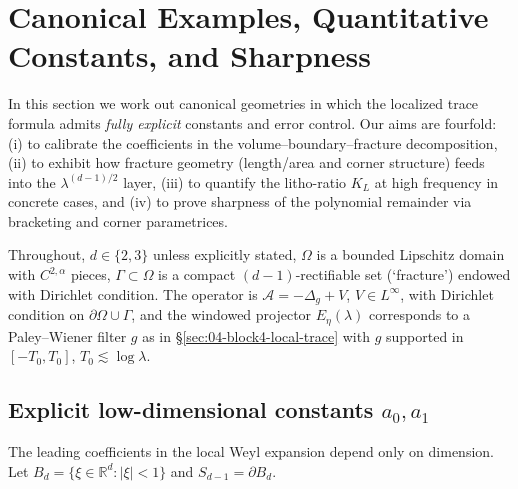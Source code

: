 

\section{Canonical Examples, Quantitative Constants, and Sharpness}
\label{sec:04-block6-canonical-examples}

In this section we work out canonical geometries in which the localized trace formula
admits \emph{fully explicit} constants and error control. Our aims are fourfold:
(i) to calibrate the coefficients in the volume--boundary--fracture decomposition,
(ii) to exhibit how fracture geometry (length/area and corner structure) feeds into the
$\lambda^{(d-1)/2}$ layer,
(iii) to quantify the litho-ratio $K_L$ at high frequency in concrete cases,
and (iv) to prove sharpness of the polynomial remainder via bracketing and corner parametrices.

Throughout, $d\in\{2,3\}$ unless explicitly stated, $\Omega$ is a bounded Lipschitz domain
with $C^{2,\alpha}$ pieces, $\Gamma\subset\Omega$ is a compact $(d-1)$-rectifiable set
(`fracture') endowed with Dirichlet condition. The operator is
$\mathcal{A}=-\Delta_g + V$, $V\in L^\infty$, with Dirichlet condition on $\partial\Omega\cup\Gamma$,
and the windowed projector $E_\eta(\lambda)$ corresponds to a Paley--Wiener
filter $g$ as in \S\ref{sec:04-block4-local-trace} with $\widehat g$ supported in $[-T_0,T_0]$,
$T_0\lesssim \log \lambda$.

\subsection{Explicit low-dimensional constants $a_0, a_1$}
\label{sub:explicit-constants}

The leading coefficients in the local Weyl expansion depend only on dimension.
Let $B_d=\{\xi\in\mathbb{R}^d:|\xi|<1\}$ and $S_{d-1}=\partial B_d$.

